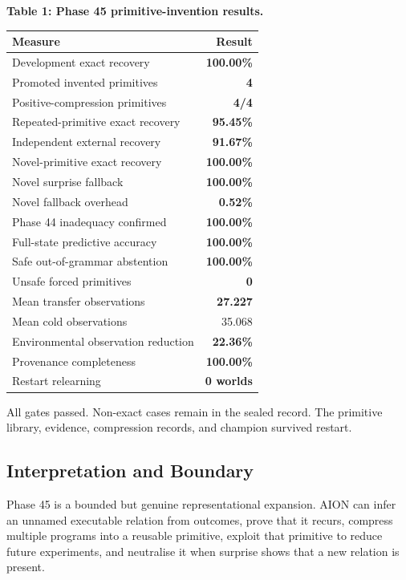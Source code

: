 \begin{center}
\begin{minipage}{0.78\textwidth}
\centering
\textbf{Table 1: Phase 45 primitive-invention results.}\\[0.35em]
\begin{tabular}{lr}
\hline
Measure & Result \\
\hline
Development exact recovery & \textbf{100.00\%} \\
Promoted invented primitives & \textbf{4} \\
Positive-compression primitives & \textbf{4/4} \\
Repeated-primitive exact recovery & \textbf{95.45\%} \\
Independent external recovery & \textbf{91.67\%} \\
Novel-primitive exact recovery & \textbf{100.00\%} \\
Novel surprise fallback & \textbf{100.00\%} \\
Novel fallback overhead & \textbf{0.52\%} \\
Phase 44 inadequacy confirmed & \textbf{100.00\%} \\
Full-state predictive accuracy & \textbf{100.00\%} \\
Safe out-of-grammar abstention & \textbf{100.00\%} \\
Unsafe forced primitives & \textbf{0} \\
Mean transfer observations & \textbf{27.227} \\
Mean cold observations & 35.068 \\
Environmental observation reduction & \textbf{22.36\%} \\
Provenance completeness & \textbf{100.00\%} \\
Restart relearning & \textbf{0 worlds} \\
\hline
\end{tabular}
\end{minipage}
\end{center}

All gates passed. Non-exact cases remain in the sealed record. The primitive
library, evidence, compression records, and champion survived restart.

\subsection{Interpretation and Boundary}

Phase 45 is a bounded but genuine representational expansion. AION can infer an
unnamed executable relation from outcomes, prove that it recurs, compress
multiple programs into a reusable primitive, exploit that primitive to reduce
future experiments, and neutralise it when surprise shows that a new relation
is present.

